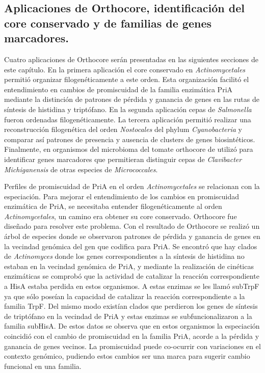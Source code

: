 \documentclass[12pt,twoside]{reedthesis}
\begin{document}
  \subsection{Aplicaciones de Orthocore, identificación del core
  conservado y de familias de genes
  marcadores.}\label{aplicaciones-de-orthocore-identificacion-del-core-conservado-y-de-familias-de-genes-marcadores.}
  
  Cuatro aplicaciones de Orthocore serán presentadas en las siguientes
  secciones de este capítulo. En la primera aplicación el core conservado
  en \emph{Actinomycetales} permitió organizar filogenéticamente a este
  orden. Esta organización facilitó el entendimiento en cambios de
  promiscuidad de la familia enzimática PriA mediante la distinción de
  patrones de pérdida y ganancia de genes en las rutas de síntesis de
  histidina y triptófano. En la segunda aplicación cepas de
  \emph{Salmonella} fueron ordenadas filogenéticamente. La tercera
  aplicación permitió realizar una reconstrucción filogenética del orden
  \emph{Nostocales} del phylum \emph{Cyanobacteria} y comparar así
  patrones de presencia y ausencia de clusters de genes biosintéticos.
  Finalmente, en organismos del microbioma del tomate orthocore de utilizó
  para identificar genes marcadores que permitieran distinguir cepas de
  \emph{Clavibacter Michiganensis} de otras especies de
  \emph{Micrococcales}.
  
  Perfiles de promiscuidad de PriA en el orden \emph{Actinomycetales} se
  relacionan con la especiación. Para mejorar el entendimiento de los
  cambios en promiscuidad enzimática de PriA, se necesitaba entender
  filogenéticamente al orden \emph{Actinomycetales}, un camino era obtener
  su core conservado. Orthocore fue diseñado para resolver este problema.
  Con el resultado de Orthocore se realizó un árbol de especies donde se
  observaron patrones de pérdida y ganancia de genes en la vecindad
  genómica del gen que codifica para PriA. Se encontró que hay clados de
  \emph{Actinomyces} donde los genes correspondientes a la síntesis de
  histidina no estaban en la vecindad genómica de PriA, y mediante la
  realización de cinéticas enzimáticas se comprobó que la actividad de
  catalizar la reacción correspondiente a HisA estaba perdida en estos
  organismos. A estas enzimas se les llamó subTrpF ya que sólo poseían la
  capacidad de catalizar la reacción correspondiente a la familia TrpF.
  Del mismo modo existían clados que perdieron los genes de síntesis de
  triptófano en la vecindad de PriA y estas enzimas se subfuncionalizaron
  a la familia subHisA. De estos datos se observa que en estos organismos
  la especiación coincidió con el cambio de promiscuidad en la familia
  PriA, acorde a la pérdida y ganancia de genes vecinos. La promiscuidad
  puede co-ocurrir con variaciones en el contexto genómico, pudiendo estos
  cambios ser una marca para sugerir cambio funcional en una familia.
  
\end{document}

